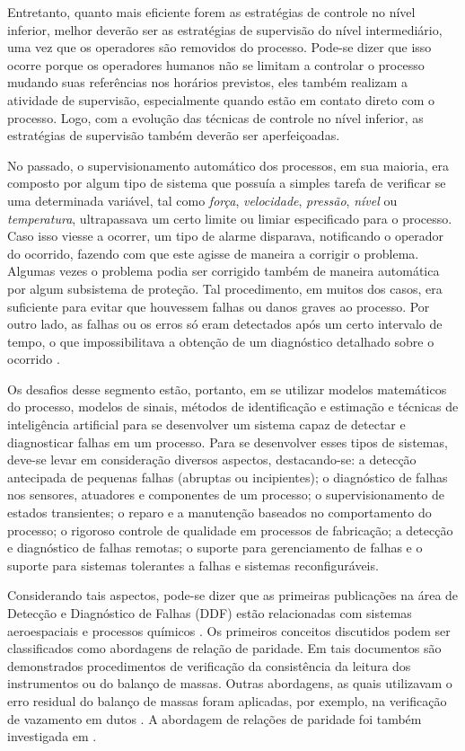 Entretanto, quanto mais eficiente forem as estratégias de controle no nível
inferior, melhor deverão ser as estratégias de supervisão do nível
intermediário, uma vez que os operadores são removidos do processo. Pode-se
dizer que isso ocorre porque os operadores humanos não se limitam a controlar o
processo mudando suas referências nos horários previstos, eles também realizam
a atividade de supervisão, especialmente quando estão em contato direto com o
processo. Logo, com a evolução das técnicas de controle no nível inferior, as
estratégias de supervisão também deverão ser aperfeiçoadas.

No passado, o supervisionamento automático dos processos, em sua maioria, era
composto por algum tipo de sistema que possuía a simples tarefa de verificar se
uma determinada variável, tal como {\it força}, {\it velocidade}, {\it pressão},
{\it nível} ou {\it temperatura}, ultrapassava um certo limite ou limiar
especificado para o processo. Caso isso viesse a ocorrer, um tipo de alarme
disparava, notificando o operador do ocorrido, fazendo com que este agisse de
maneira a corrigir o problema. Algumas vezes o problema podia ser corrigido
também de maneira automática por algum subsistema de proteção. Tal procedimento,
em muitos dos casos, era suficiente para evitar que houvessem falhas ou danos
graves ao processo. Por outro lado, as falhas ou os erros só eram detectados
após um certo intervalo de tempo, o que impossibilitava a obtenção de um
diagnóstico detalhado sobre o ocorrido \cite{isermann:2006}.

Os desafios desse segmento estão, portanto, em se utilizar modelos matemáticos
do processo, modelos de sinais, métodos de identificação e estimação e técnicas
de inteligência artificial para se desenvolver um sistema capaz de detectar e
diagnosticar falhas em um processo. Para se desenvolver esses tipos de sistemas,
deve-se levar em consideração diversos aspectos, destacando-se: a detecção
antecipada de pequenas falhas (abruptas ou incipientes); o diagnóstico de falhas
nos sensores, atuadores e componentes de um processo; o supervisionamento de
estados transientes; o reparo e a manutenção baseados no comportamento do
processo; o rigoroso controle de qualidade em processos de fabricação; a
detecção e diagnóstico de falhas remotas; o suporte para gerenciamento de falhas
e o suporte para sistemas tolerantes a falhas e sistemas reconfiguráveis.

Considerando tais aspectos, pode-se dizer que as primeiras publicações na área
de Detecção e Diagnóstico de Falhas (DDF) estão relacionadas com sistemas
aeroespaciais \cite{beard:1971,jones:1973,willsky:1976,clark:1978} e processos
químicos \cite{himmelblau:1978}. Os primeiros conceitos discutidos podem ser
classificados como abordagens de relação de paridade. Em tais documentos são
demonstrados procedimentos de verificação da consistência da leitura dos
instrumentos ou do balanço de massas. Outras abordagens, as quais utilizavam o
erro residual do balanço de massas foram aplicadas, por exemplo, na verificação
de vazamento em dutos \cite{billman:1987}. A abordagem de relações de paridade
foi também investigada em .

